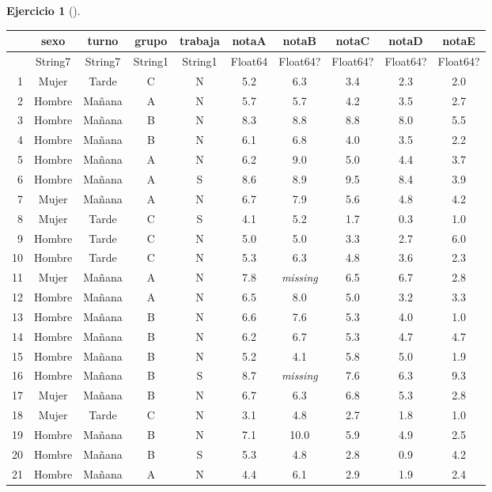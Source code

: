 \documentclass[
  a4paper,
]{scrreport}
\theoremstyle{definition}
\newtheorem{exercise}{Ejercicio}[chapter]
\theoremstyle{remark}
\begin{document}
\begin{exercise}[]
\begin{enumerate}
\begin{tcolorbox}
  \begin{tabular}{r|ccccccccc}
      & sexo & turno & grupo & trabaja & notaA & notaB & notaC & notaD & notaE\\
      \hline
      & String7 & String7 & String1 & String1 & Float64 & Float64? & Float64? & Float64? & Float64?\\
      \hline
      1 & Mujer & Tarde & C & N & 5.2 & 6.3 & 3.4 & 2.3 & 2.0 \\
      2 & Hombre & Mañana & A & N & 5.7 & 5.7 & 4.2 & 3.5 & 2.7 \\
      3 & Hombre & Mañana & B & N & 8.3 & 8.8 & 8.8 & 8.0 & 5.5 \\
      4 & Hombre & Mañana & B & N & 6.1 & 6.8 & 4.0 & 3.5 & 2.2 \\
      5 & Hombre & Mañana & A & N & 6.2 & 9.0 & 5.0 & 4.4 & 3.7 \\
      6 & Hombre & Mañana & A & S & 8.6 & 8.9 & 9.5 & 8.4 & 3.9 \\
      7 & Mujer & Mañana & A & N & 6.7 & 7.9 & 5.6 & 4.8 & 4.2 \\
      8 & Mujer & Tarde & C & S & 4.1 & 5.2 & 1.7 & 0.3 & 1.0 \\
      9 & Hombre & Tarde & C & N & 5.0 & 5.0 & 3.3 & 2.7 & 6.0 \\
      10 & Hombre & Tarde & C & N & 5.3 & 6.3 & 4.8 & 3.6 & 2.3 \\
      11 & Mujer & Mañana & A & N & 7.8 & \emph{missing} & 6.5 & 6.7 & 2.8 \\
      12 & Hombre & Mañana & A & N & 6.5 & 8.0 & 5.0 & 3.2 & 3.3 \\
      13 & Hombre & Mañana & B & N & 6.6 & 7.6 & 5.3 & 4.0 & 1.0 \\
      14 & Hombre & Mañana & B & N & 6.2 & 6.7 & 5.3 & 4.7 & 4.7 \\
      15 & Hombre & Mañana & B & N & 5.2 & 4.1 & 5.8 & 5.0 & 1.9 \\
      16 & Hombre & Mañana & B & S & 8.7 & \emph{missing} & 7.6 & 6.3 & 9.3 \\
      17 & Mujer & Mañana & B & N & 6.7 & 6.3 & 6.8 & 5.3 & 2.8 \\
      18 & Mujer & Tarde & C & N & 3.1 & 4.8 & 2.7 & 1.8 & 1.0 \\
      19 & Hombre & Mañana & B & N & 7.1 & 10.0 & 5.9 & 4.9 & 2.5 \\
      20 & Hombre & Mañana & B & S & 5.3 & 4.8 & 2.8 & 0.9 & 4.2 \\
      21 & Hombre & Mañana & A & N & 4.4 & 6.1 & 2.9 & 1.9 & 2.4 \\

\end{tabular}
\end{tcolorbox}
\end{enumerate}
\end{exercise}
\end{document}
